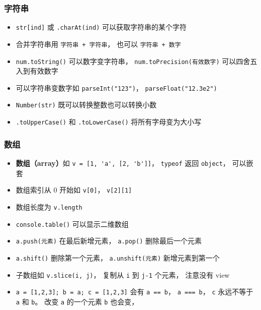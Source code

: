 \subsubsection{字符串}
\begin{itemize}
\item \verb|str[ind]| 或 \verb|.charAt(ind)| 可以获取字符串的某个字符
\item 合并字符串用 \verb|字符串 + 字符串|， 也可以 \verb|字符串 + 数字|
\item \verb|num.toString()| 可以数字变字符串， \verb|num.toPrecision(有效数字)| 可以四舍五入到有效数字
\item 可以字符串变数字如 \verb|parseInt("123")|， \verb|parseFloat("12.3e2")|
\item \verb|Number(str)| 既可以转换整数也可以转换小数
\item \verb|.toUpperCase()| 和 \verb|.toLowerCase()| 将所有字母变为大小写
\end{itemize}


\subsubsection{数组}
\begin{itemize}
\item \textbf{数组（array）}如 \verb|v = [1, 'a', [2, 'b']]|， \verb|typeof| 返回 \verb|object|， 可以嵌套
\item 数组索引从 0 开始如 \verb|v[0]|， \verb|v[2][1]|
\item 数组长度为 \verb|v.length|
\item \verb|console.table()| 可以显示二维数组
\item \verb|a.push(元素)| 在最后新增元素， \verb|a.pop()| 删除最后一个元素
\item \verb|a.shift()| 删除第一个元素， \verb|a.unshift(元素)| 新增元素到第一个
\item 子数组如 \verb|v.slice(i, j)|， 复制从 \verb|i| 到 \verb|j-1| 个元素， 注意没有 view
\item \verb|a = [1,2,3]; b = a; c = [1,2,3]| 会有 \verb|a == b|， \verb|a === b|， \verb|c| 永远不等于 \verb|a| 和 \verb|b|。 改变 \verb|a| 的一个元素 \verb|b| 也会变， 
\end{itemize}

